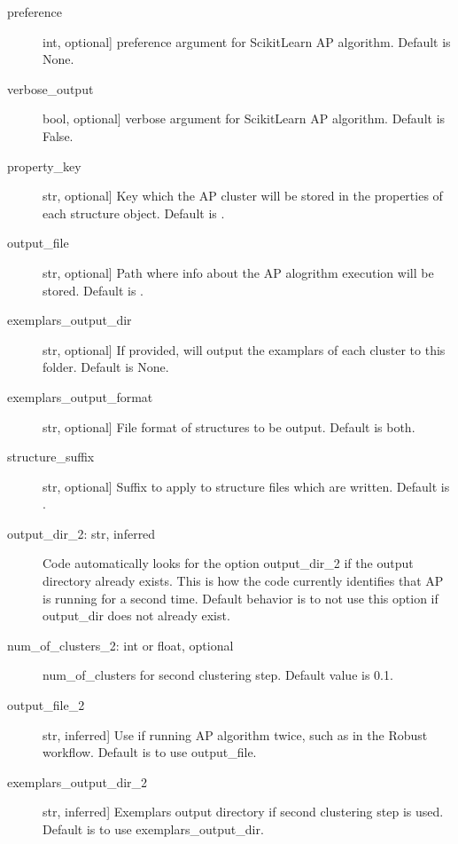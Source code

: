 \documentclass[letterpaper,10pt,english]{sphinxmanual}
\begin{document}
\begin{fulllineitems}
\begin{fulllineitems}
\begin{description}
\item[{preference}] \leavevmode{[}int, optional{]}
preference argument for Scikit\sphinxhyphen{}Learn AP algorithm. Default is None.

\item[{verbose\_output}] \leavevmode{[}bool, optional{]}
verbose argument for Scikit\sphinxhyphen{}Learn AP algorithm. Default is False.

\item[{property\_key}] \leavevmode{[}str, optional{]}
Key which the AP cluster will be stored in the properties of
each structure object. Default is .

\item[{output\_file}] \leavevmode{[}str, optional{]}
Path where info about the AP alogrithm execution will be stored.
Default is .

\item[{exemplars\_output\_dir}] \leavevmode{[}str, optional{]}
If provided, will output the examplars of each cluster to this
folder. Default is None.

\item[{exemplars\_output\_format}] \leavevmode{[}str, optional{]}
File format of structures to be output. Default is both.

\item[{structure\_suffix}] \leavevmode{[}str, optional{]}
Suffix to apply to structure files which are written.
Default is .

\item[{output\_dir\_2: str, inferred}] \leavevmode
Code automatically looks for the option output\_dir\_2 if the
output directory already exists. This is how the code currently
identifies that AP is running for a second time. Default behavior
is to not use this option if output\_dir does not already exist.

\item[{num\_of\_clusters\_2: int or float, optional}] \leavevmode
num\_of\_clusters for second clustering step. Default value is 0.1.

\item[{output\_file\_2}] \leavevmode{[}str, inferred{]}
Use if running AP algorithm twice, such as in the Robust workflow.
Default is to use output\_file.

\item[{exemplars\_output\_dir\_2}] \leavevmode{[}str, inferred{]}
Exemplars output directory if second clustering step is used.
Default is to use exemplars\_output\_dir.


\end{description}
\end{fulllineitems}
\end{fulllineitems}
\end{document}
